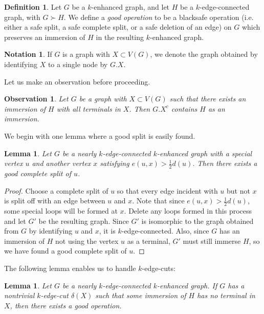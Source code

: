 \documentclass[letterpaper,11pt]{article}
\newtheorem{lemma}[theorem]{Lemma}
\newtheorem{observation}[theorem]{Observation}
\theoremstyle{definition}
\newtheorem*{definition}{Definition}
\newtheorem*{notation}{Notation}
\newcommand{\col}{black}
\begin{document}
\begin{definition}
	Let $G$ be a $k$-enhanced graph, and let $H$ be a $k$-edge-connected graph, with $G\succ H$. We define a  \emph{good operation} to be a {\color \col {safe operation (i.e. either}} a  safe split, a safe complete split, or a safe deletion of an edge) on $G$ which preserves an immersion of $H$ in the resulting $k$-enhanced graph.
\end{definition}



\begin{notation}
	If $G$ is a graph with $X \subset V(G)$, we denote the graph obtained by identifying $X$ to a single node by $G.X$.
\end{notation} 



Let us make an observation before proceeding.

\begin{observation}
	Let $G$ be a graph with $X \subset V(G)$ such that there exists an immersion of $H$ with all terminals in $X$. Then $G.X^c$ contains $H$ as an immersion.
\end{observation}

We begin with one lemma where a good split is easily found.  



\begin{lemma}
\label{overloadedspecial}
Let $G$ be a nearly $k$-edge-connected $k$-enhanced graph with a special vertex $u$ and another vertex $x$ satisfying $e(u,x) > \frac{1}{2}d(u)$. Then there exists a good complete split of $u$.
\end{lemma}

\begin{proof}
Choose a complete split of $u$ so that every edge incident with $u$ but not $x$ is split off with an edge between $u$ and $x$. Note that since $e(u,x) > \frac{1}{2}d(u)$, some special loops will be formed at $x$. Delete any loops formed in this process and let $G'$ be the resulting graph.  Since $G'$ is isomorphic to the graph obtained from $G$ by identifying $u$ and $x$, it is $k$-edge-connected. Also, since $G$ has an immersion of $H$ not using the vertex $u$ as a terminal, $G'$ must still immerse $H$, so we have found a good complete split of $u$.
\end{proof}



The following lemma enables us to handle $k$-edge-cuts:


\begin{lemma}
\label{lem2}
Let $G$ be a nearly $k$-edge-connected $k$-enhanced graph. If $G$ has a nontrivial $k$-edge-cut $\delta (X)$ such that some immersion of $H$ has no terminal in $X$, then there exists a good operation.
\end{lemma}
\end{document}
